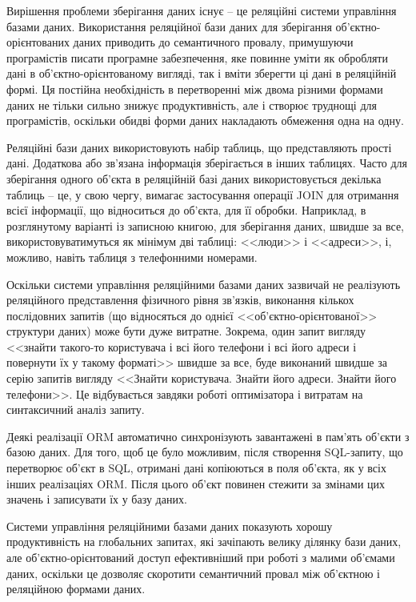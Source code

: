 \par Вирішення проблеми зберігання даних існує -- це реляційні системи управління базами даних. Використання реляційної бази даних для зберігання об'єктно-орієнтованих даних приводить до семантичного провалу, примушуючи програмістів писати програмне забезпечення, яке повинне уміти як обробляти дані в об'єктно-орієнтованому вигляді, так і вміти зберегти ці дані в реляційній формі. Ця постійна необхідність в перетворенні між двома різними формами даних не тільки сильно знижує продуктивність, але і створює труднощі для програмістів, оскільки обидві форми даних накладають обмеження одна на одну.
\par Реляційні бази даних використовують набір таблиць, що представляють прості дані. Додаткова або зв'язана інформація зберігається в інших таблицях. Часто для зберігання одного об'єкта в реляційній базі даних використовується декілька таблиць -- це, у свою чергу, вимагає застосування операції JOIN для отримання всієї інформації, що відноситься до об'єкта, для її обробки. Наприклад, в розглянутому варіанті із записною книгою, для зберігання даних, швидше за все, використовуватимуться як мінімум дві таблиці: <<люди>> і <<адреси>>, і, можливо, навіть таблиця з телефонними номерами.
\par Оскільки системи управління реляційними базами даних зазвичай не реалізують реляційного представлення фізичного рівня зв'язків, виконання кількох послідовних запитів (що відносяться до однієї <<об'єктно-орієнтованої>> структури даних) може бути дуже витратне. Зокрема, один запит вигляду <<знайти такого-то користувача і всі його телефони і всі його адреси і повернути їх у такому форматі>> швидше за все, буде виконаний швидше за серію запитів вигляду <<Знайти користувача. Знайти його адреси. Знайти його телефони>>. Це відбувається завдяки роботі оптимізатора і витратам на синтаксичний аналіз запиту.
\par Деякі реалізації ORM автоматично синхронізують завантажені в пам'ять об'єкти з базою даних. Для того, щоб це було можливим, після створення SQL-запиту, що перетворює об'єкт в SQL, отримані дані копіюються в поля об'єкта, як у всіх інших реалізаціях ORM. Після цього об'єкт повинен стежити за змінами цих значень і записувати їх у базу даних.
\par Системи управління реляційними базами даних показують хорошу продуктивність на глобальних запитах, які зачіпають велику ділянку бази даних, але об'єктно-орієнтований доступ ефективніший при роботі з малими об'ємами даних, оскільки це дозволяє скоротити семантичний провал між об'єктною і реляційною формами даних.
